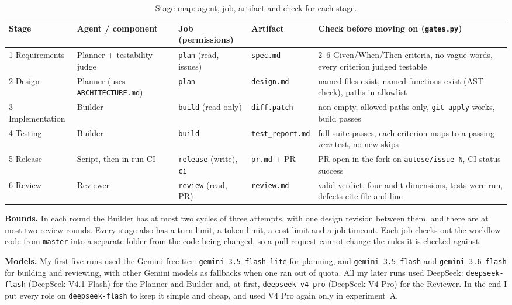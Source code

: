 \documentclass[10pt,a4paper]{article}
\newcommand{\code}[1]{\texttt{#1}}
\begin{document}
\begin{table}[h]
\centering\footnotesize
\caption{Stage map: agent, job, artifact and check for each stage.}
\label{tab:stagemap}
\begin{tabularx}{\textwidth}{@{}l l l l L@{}}
\toprule
Stage & Agent / component & Job (permissions) & Artifact & Check before moving on (\code{gates.py}) \\
 Requirements & Planner + testability judge & \code{plan} (read, issues) & \code{spec.md} & 2--6 Given/When/Then criteria, no vague words, every criterion judged testable \\
2 Design & Planner (uses \code{ARCHITECTURE.md}) & \code{plan} & \code{design.md} & named files exist, named functions exist (AST check), paths in allowlist \\
3 Implementation & Builder & \code{build} (read only) & \code{diff.patch} & non-empty, allowed paths only, \code{git apply} works, build passes \\
4 Testing & Builder & \code{build} & \code{test\_report.md} & full suite passes, each criterion maps to a passing \emph{new} test, no new skips \\
5 Release & Script, then in-run CI & \code{release} (write), \code{ci} & \code{pr.md} + PR & PR open in the fork on \code{autose/issue-N}, CI status success \\
6 Review & Reviewer & \code{review} (read, PR) & \code{review.md} & valid verdict, four audit dimensions, tests were run, defects cite file and line \\
\bottomrule
\end{tabularx}
\end{table}

\textbf{Bounds.} In each round the Builder has at most two cycles of three attempts, with one design
revision between them, and there are at most two review rounds. Every stage also has a turn limit, a
token limit, a cost limit and a job timeout. Each job checks out the workflow code from \code{master}
into a separate folder from the code being changed, so a pull request cannot change the rules it is
checked against.

\textbf{Models.} My first five runs used the Gemini free tier: \code{gemini-3.5-flash-lite} for
planning, and \code{gemini-3.5-flash} and \code{gemini-3.6-flash} for building and reviewing, with other
Gemini models as fallbacks when one ran out of quota. All my later runs used DeepSeek:
\code{deepseek-flash} (DeepSeek V4.1 Flash) for the Planner and Builder and, at first,
\code{deepseek-v4-pro} (DeepSeek V4 Pro) for the Reviewer. In the end I put every role
on \code{deepseek-flash} to keep it simple and cheap, and used V4 Pro again only in experiment~A.
\end{document}

